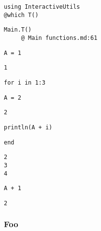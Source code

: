 \begin{lstlisting}[]
using InteractiveUtils
@which T()
\end{lstlisting}


\begin{lstlisting}[]
Main.T()
     @ Main functions.md:61
\end{lstlisting}




\begin{lstlisting}[]
A = 1
\end{lstlisting}


\begin{lstlisting}[]
1
\end{lstlisting}




\begin{lstlisting}[]
for i in 1:3
\end{lstlisting}




\begin{lstlisting}[]
A = 2
\end{lstlisting}


\begin{lstlisting}[]
2
\end{lstlisting}




\begin{lstlisting}[]
    println(A + i)
\end{lstlisting}




\begin{lstlisting}[]
end
\end{lstlisting}


\begin{lstlisting}[]
2
3
4
\end{lstlisting}




\begin{lstlisting}[]
A + 1
\end{lstlisting}


\begin{lstlisting}[]
2
\end{lstlisting}



\subsubsection{Foo}



